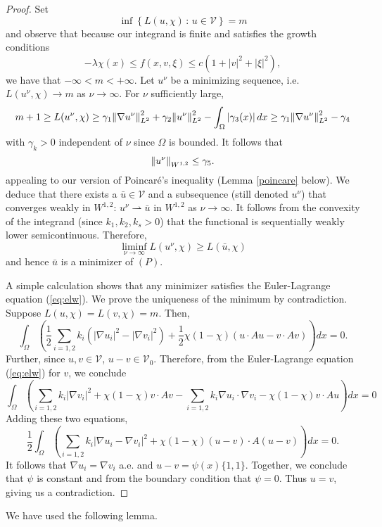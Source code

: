 \documentclass[11pt]{article}
\begin{document}
\begin{proof}
Set 
$$
\inf\left\{L(u,\chi)\,:\, u\in\mathcal{V}\right\}=m
$$
and observe that because our integrand is finite and satisfies the growth conditions 
$$
-\lambda \chi(x)\leq f(x,v,\xi) \leq c(1+|v|^2+|\xi|^2),
$$
we have that $-\infty<m<+\infty$.  Let $u^\nu$ be a minimizing sequence, i.e. $L(u^\nu, \chi)\rightarrow m$ as $ \nu \to \infty$. For $\nu$ sufficiently large, 
$$
m+1\geq L(u^\nu,\chi)
\geq \gamma_1\norm{\nabla u^\nu}^2_{L^2}+\gamma_2\norm{u^\nu}^2_{L^2} -\int_\Omega |\gamma_3(x)|\,dx
\geq \gamma_1\norm{\nabla u^\nu}^2_{L^2}-\gamma_4
$$
with $\gamma_k>0$ independent of $\nu$ since $\Omega$ is bounded.   It follows that 
$$
\norm{u^\nu}_{W^{1,2}}\leq\gamma_5.
$$
appealing to our version of Poincar{\'e}'s inequality (Lemma \ref{poincare} below).
We deduce that there exists a $\bar{u}\in\mathcal{V}$  and a subsequence (still denoted $u^\nu$) that converges weakly in $W^{1,2}$:  $u^\nu\rightharpoonup \bar{u}$ in $W^{1,2}$ as $\nu\rightarrow \infty$.
It follows from the convexity of the integrand (since $k_1, k_2, k_s >0$) that the functional is sequentially weakly lower semicontinuous.  Therefore,
$$
\liminf_{\nu\rightarrow\infty}L(u^\nu,\chi)\geq L(\bar{u},\chi)
$$
and hence $\bar{u}$ is a minimizer of $(P)$. 

A simple calculation shows that any minimizer satisfies the Euler-Lagrange equation (\ref{eq:elw}).  We prove the uniqueness of the minimum by contradiction.  Suppose $L(u,\chi) = L(v,\chi) = m$.  Then, 
$$
\int_\Omega \left(  \frac{1}{2} \sum_{i=1,2} k_i (|\nabla u_i|^2 - |\nabla v_i|^2) + \frac{1}{2} \chi(1-\chi)
(u \cdot A u - v \cdot A v) \right) dx = 0.
$$
Further, since $u,v \in {\mathcal V}$, $u-v \in {\mathcal V}_0$.  Therefore, from the Euler-Lagrange equation (\ref{eq:elw}) for $v$, we conclude
$$
\int_\Omega \left( \sum_{i=1,2} k_i |\nabla v_i|^2  + \chi(1-\chi) v \cdot A v 
- \sum_{i=1,2} k_i \nabla u_i \cdot \nabla v_i - \chi(1-\chi) v \cdot A u \right) dx =0
$$
Adding these two equations, 
$$
 \frac{1}{2} \int_\Omega \left( \sum_{i=1,2} k_i |\nabla u_i - \nabla v_i|^2 + 
 \chi(1-\chi) (u-v) \cdot A (u-v) \right) dx =0.
 $$
It follows that $\nabla u_i = \nabla v_i$ a.e. and $u-v = \psi(x) \{1,1\}$.  Together, we conclude that $\psi$ is constant and from the boundary condition that $\psi=0$.  Thus $u=v$, giving us a contradiction.
\end{proof}

We have used the following lemma.
\end{document}
